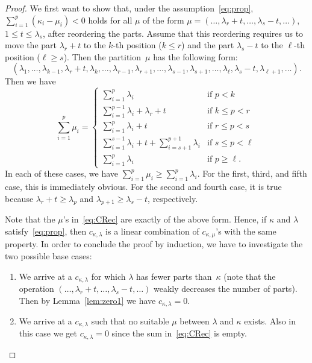 \documentclass[10pt,oneside,american]{amsart}
\numberwithin{equation}{section}
\numberwithin{figure}{section}
\theoremstyle{plain}
\theoremstyle{definition}
\theoremstyle{remark}
\theoremstyle{plain}
\theoremstyle{definition}
\theoremstyle{plain}
\theoremstyle{plain}
\begin{document}
\begin{proof}
  We first want to show that, under the assumption~\eqref{eq:prop},
  $\sum_{i=1}^p(\kappa_i-\mu_i)<0$ holds for all $\mu$ of the form
  $\mu=(\dots,\lambda_r+t,\dots,\lambda_s-t,\dots)$, $1\leq t\leq \lambda_s$,
  after reordering the parts. Assume that this reordering requires us
  to move the part $\lambda_r+t$ to the $k$-th position ($k\leq r$) and
  the part $\lambda_s-t$ to the $\ell$-th position ($\ell\geq s$). Then
  the partition~$\mu$ has the following form:
  \[
    (\lambda_1,\dots,\lambda_{k-1},\lambda_r+t,\lambda_k,\dots,
    \lambda_{r-1},\lambda_{r+1},\dots,\lambda_{s-1},\lambda_{s+1},\dots,
    \lambda_{\ell},\lambda_s-t,\lambda_{\ell+1},\dots).
  \]
  Then we have
  \[
    \sum_{i=1}^p \mu_i =
    \begin{cases}
      \sum_{i=1}^p \lambda_i & \text{if } p<k \\
      \sum_{i=1}^{p-1} \lambda_i + \lambda_r+t & \text{if } k\leq p<r \\
      \sum_{i=1}^p \lambda_i + t & \text{if } r\leq p<s \\
      \sum_{i=1}^{s-1} \lambda_i + t + \sum_{i=s+1}^{p+1}\lambda_i & \text{if } s\leq p<\ell \\
      \sum_{i=1}^p \lambda_i & \text{if } p\geq\ell.
    \end{cases}
  \]
  In each of these cases, we have $\sum_{i=1}^p \mu_i \geq \sum_{i=1}^p
  \lambda_i$.  For the first, third, and fifth case, this is immediately
  obvious. For the second and fourth case, it is true because
  $\lambda_r+t\geq\lambda_p$ and $\lambda_{p+1}\geq\lambda_s-t$, respectively.

  Note that the $\mu$'s in~\eqref{eq:CRec} are exactly of the above form.
  Hence, if $\kappa$ and $\lambda$ satisfy~\eqref{eq:prop}, then
  $c_{\kappa,\lambda}$ is a linear combination of $c_{\kappa,\mu}$'s with the
  same property. In order to conclude the proof by induction, we have to
  investigate the two possible base cases:
  \begin{enumerate}
  \item We arrive at a $c_{\kappa,\lambda}$ for which $\lambda$ has fewer
    parts than~$\kappa$ (note that the operation
    $(\dots,\lambda_r+t,\dots,\lambda_s-t,\dots)$ weakly decreases the number
    of parts). Then by Lemma~\ref{lem:zero1} we have $c_{\kappa,\lambda}=0$.
  \item We arrive at a $c_{\kappa,\lambda}$ such that no suitable $\mu$
    between $\lambda$ and $\kappa$ exists.  Also in this case we get
    $c_{\kappa,\lambda}=0$ since the sum in~\eqref{eq:CRec} is empty.
  \end{enumerate}
\end{proof}
\end{document}
